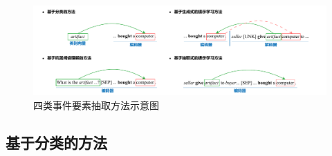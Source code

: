 \begin{figure}[htp]
   \centering
   \includegraphics[width=1\linewidth]{figures/chap2/four_cls.pdf}
   \caption{四类事件要素抽取方法示意图}
   \label{four_cls}
\end{figure}

\subsection{基于分类的方法}

